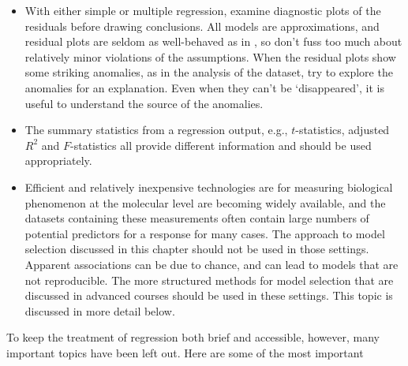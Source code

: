 \begin{itemize}
	\item  With either simple or multiple regression, examine diagnostic plots of the residuals before drawing conclusions.  All models are approximations, and residual plots are seldom as well-behaved as in , so don't fuss too much about relatively minor violations of the assumptions.  When the residual plots show some striking anomalies, as in the analysis of the  dataset, try to explore the anomalies for an explanation.  Even when they can't be `disappeared', it is useful to understand the source of the anomalies.
	
	\item  The summary statistics from a regression output, e.g., $t$-statistics, adjusted $R^2$ and $F$-statistics all provide different information and should be used appropriately.

	\item Efficient and relatively inexpensive technologies are for measuring biological phenomenon at the molecular level are becoming widely available, and the datasets containing these measurements often contain large numbers of potential predictors for a response for many cases.  The approach to model selection discussed in this chapter should not be used in those settings.  Apparent associations can be due to chance, and can lead to models that are not reproducible.   The more structured methods for model selection that are discussed in advanced courses should be used in these settings.  This topic is discussed in more detail below. 
	
	

\end{itemize}

To keep the treatment of regression both brief and accessible, however, many important topics have been left out.  Here are some of the most important


